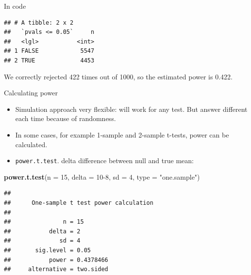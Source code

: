 \documentclass[ignorenonframetext,]{beamer}
\newenvironment{Shaded}{\begin{snugshade}}{\end{snugshade}}
\newcommand{\DataTypeTok}[1]{\textcolor[rgb]{0.13,0.29,0.53}{#1}}
\newcommand{\DecValTok}[1]{\textcolor[rgb]{0.00,0.00,0.81}{#1}}
\newcommand{\FloatTok}[1]{\textcolor[rgb]{0.00,0.00,0.81}{#1}}
\newcommand{\KeywordTok}[1]{\textcolor[rgb]{0.13,0.29,0.53}{\textbf{#1}}}
\newcommand{\NormalTok}[1]{#1}
\newcommand{\OperatorTok}[1]{\textcolor[rgb]{0.81,0.36,0.00}{\textbf{#1}}}
\newcommand{\StringTok}[1]{\textcolor[rgb]{0.31,0.60,0.02}{#1}}
\providecommand{\tightlist}{%
  \setlength{\itemsep}{0pt}\setlength{\parskip}{0pt}}
\begin{document}
\begin{frame}[fragile]{In code}
\protect\hypertarget{in-code}{}

\begin{Shaded}
\end{Shaded}

\begin{verbatim}
## # A tibble: 2 x 2
##   `pvals <= 0.05`     n
##   <lgl>           <int>
## 1 FALSE            5547
## 2 TRUE             4453
\end{verbatim}

We correctly rejected 422 times out of 1000, so the estimated power is
0.422.

\end{frame}

\begin{frame}[fragile]{Calculating power}
\protect\hypertarget{calculating-power}{}

\begin{itemize}
\tightlist
\item
  Simulation approach very flexible: will work for any test. But answer
  different each time because of randomness.
\item
  In some cases, for example 1-sample and 2-sample t-tests, power can be
  calculated.
\item
  \texttt{power.t.test}. delta difference between null and true mean:
\end{itemize}

\small

\begin{Shaded}
\begin{Highlighting}[]
\KeywordTok{power.t.test}\NormalTok{(}\DataTypeTok{n =} \DecValTok{15}\NormalTok{, }\DataTypeTok{delta =} \DecValTok{10-8}\NormalTok{, }\DataTypeTok{sd =} \DecValTok{4}\NormalTok{, }\DataTypeTok{type =} \StringTok{"one.sample"}\NormalTok{)}
\end{Highlighting}
\end{Shaded}

\begin{verbatim}
## 
##      One-sample t test power calculation 
## 
##               n = 15
##           delta = 2
##              sd = 4
##       sig.level = 0.05
##           power = 0.4378466
##     alternative = two.sided
\end{verbatim}

\normalsize

\end{frame}
\end{document}
